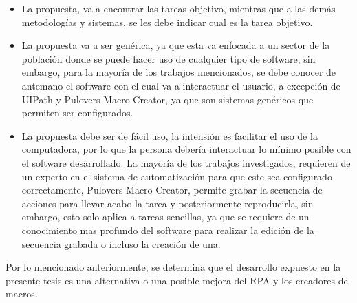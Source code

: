\begin{itemize}

\item {La propuesta, va a encontrar las tareas objetivo, mientras que a las
 dem\'as metodolog\'ias y sistemas, se les debe indicar cual es la tarea
 objetivo.}

\item {La propuesta va a ser gen\'erica, ya que esta va enfocada a un sector
 de la poblaci\'on donde se puede hacer uso de cualquier tipo de software, sin
 embargo, para la mayor\'ia de los trabajos mencionados, se debe conocer de
 antemano el software con el cual va a interactuar el usuario, a excepci\'on
 de UIPath y Pulover\textsc{}s Macro Creator, ya que son sistemas
 gen\'ericos que permiten ser configurados.}

\newpage

\item {La propuesta debe ser de f\'acil uso, la intensi\'on es facilitar el
 uso de la computadora, por lo que la persona deber\'ia interactuar lo
 m\'inimo posible con el software desarrollado. La mayor\'ia de los trabajos 
 investigados, requieren de un experto en el sistema de automatizaci\'on para 
 que este sea configurado correctamente, Pulover\textsc{}s Macro 
 Creator, permite grabar la secuencia de acciones para llevar acabo la tarea 
 y posteriormente reproducirla, sin embargo, esto solo aplica a tareas 
 sencillas, ya que se requiere de un conocimiento mas profundo del 
 software para realizar la edici\'on de la secuencia grabada o incluso la 
 creaci\'on de una.}

\end{itemize}


Por lo mencionado anteriormente, se determina que el desarrollo expuesto en
 la presente tesis es una alternativa o una posible mejora del RPA y los
 creadores de macros.
